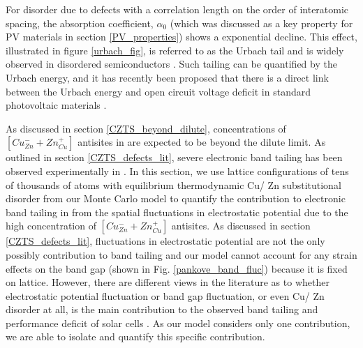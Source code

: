 \documentclass[11pt, twoside]{report}
\begin{document}
For disorder due to defects with a correlation length on the order of interatomic spacing, the absorption coefficient, $\alpha_{0}$ (which was discussed as a key property for PV materials in section \ref{PV_properties}) shows a exponential decline. This effect, illustrated in figure \ref{urbach_fig}, is referred to as the Urbach tail \cite{Urbach1953} and is widely observed in disordered semiconductors \cite{thin_film_Boer}. Such tailing can be quantified by the Urbach energy, and it has recently been proposed that there is a direct link between the Urbach energy and open circuit voltage deficit in standard photovoltaic materials \cite{culprit, UrbachE_Voc}.

As discussed in section \ref{CZTS_beyond_dilute}, concentrations of $[Cu_{Zn}^{-} + Zn_{Cu}^{+}]$ antisites in {\CZTS} are expected to be beyond the dilute limit. As outlined in section \ref{CZTS_defects_lit}, severe electronic band tailing has been observed experimentally in {\CZTS} \cite{band_tail, kesterite_band_tails}. In this section, we use lattice configurations of tens of thousands of atoms with equilibrium thermodynamic Cu/ Zn substitutional disorder from our Monte Carlo model to quantify the contribution to electronic band tailing in {\CZTS} from the spatial fluctuations in electrostatic potential due to the high concentration of $[Cu_{Zn}^{-} + Zn_{Cu}^{+}]$ antisites. 
As discussed in  section \ref{CZTS_defects_lit}, fluctuations in electrostatic potential are not the only possibly contribution to band tailing and our model cannot account for any strain effects on the band gap (shown in Fig. \ref{pankove_band_fluc}) because it is fixed on lattice. However, there are different views in the literature as to whether electrostatic potential fluctuation or band gap fluctuation, or even Cu/ Zn disorder at all, is the main contribution to the observed band tailing and performance deficit of {\CZTS} solar cells \cite{culprit, kesterite_band_tails, band_tail}. As our model considers only one contribution, we are able to isolate and quantify this specific contribution.
\end{document}
